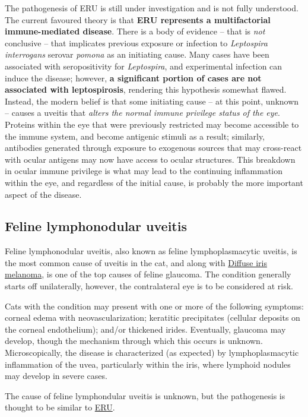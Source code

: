 \documentclass[openany]{article}
\begin{document}
The pathogenesis of ERU is still under investigation and is not fully
understood. The current favoured theory is that \textbf{ERU represents a
multifactorial immune-mediated disease}. There is a body of evidence --
that is \emph{not} conclusive -- that implicates previous exposure or
infection to \emph{Leptospira interrogans} serovar \emph{pomona} as an
initiating cause. Many cases have been associated with seropositivity
for \emph{Leptospira}, and experimental infection can induce the
disease; however, \textbf{a significant portion of cases are not
associated with leptospirosis}, rendering this hypothesis somewhat
flawed. Instead, the modern belief is that some initiating cause -- at
this point, unknown -- causes a uveitis that \emph{alters the normal
immune privilege status of the eye}. Proteins within the eye that were
previously restricted may become accessible to the immune system, and
become antigenic stimuli as a result; similarly, antibodies generated
through exposure to exogenous sources that may cross-react with ocular
antigens may now have access to ocular structures. This breakdown in
ocular immune privilege is what may lead to the continuing inflammation
within the eye, and regardless of the initial cause, is probably the
more important aspect of the disease.

\hypertarget{feline-lymphonodular-uveitis}{\subsection{Feline
lymphonodular uveitis}\label{feline-lymphonodular-uveitis}}

Feline lymphonodular uveitis, also known as feline lymphoplasmacytic
uveitis, is the most common cause of uveitis in the cat, and along with
\protect\hyperlink{diffuse-iris-melanoma}{Diffuse iris melanoma}, is one
of the top causes of feline glaucoma. The condition generally starts off
unilaterally, however, the contralateral eye is to be considered at
risk.

Cats with the condition may present with one or more of the following
symptoms: corneal edema with neovascularization; keratitic precipitates
(cellular deposits on the corneal endothelium); and/or thickened irides.
Eventually, glaucoma may develop, though the mechanism through which
this occurs is unknown. Microscopically, the disease is characterized
(as expected) by lymphoplasmacytic inflammation of the uvea,
particularly within the iris, where lymphoid nodules may develop in
severe cases.

The cause of feline lymphondular uveitis is unknown, but the
pathogenesis is thought to be similar to
\protect\hyperlink{equine-recurrent-uveitis}{ERU}.
\end{document}
